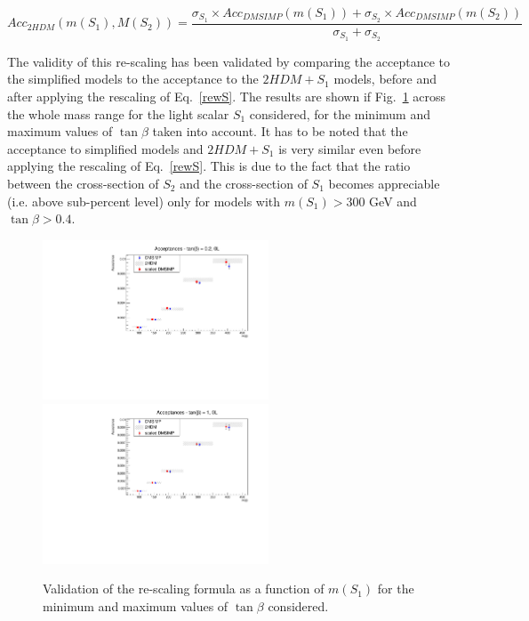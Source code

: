 \begin{equation}
Acc_{2HDM}(m(S_1),M(S_2))=\frac{\sigma_{S_1} \times Acc_{DMSIMP}(m(S_{1}))+
\sigma_{S_2} \times Acc_{DMSIMP}(m(S_{2}))}{\sigma_{S_1}+\sigma_{S_2}}
\label{rewS}
\end{equation}


The validity of this re-scaling has been validated by comparing the acceptance 
to the simplified models to the acceptance to the $2HDM+S_1$ models, before and 
after applying the rescaling of Eq.~\ref{rewS}. The results are shown if Fig.~\ref{fig:rescS1} across the whole
mass range for the light scalar $S_1$ considered, for the minimum and maximum values of 
$\tan\beta$ taken into account. 
It has to be noted that the acceptance to simplified models and $2HDM+S_1$ is very similar even 
before applying the rescaling of Eq.~\ref{rewS}.
This is due to the fact that the ratio between the cross-section of $S_2$ and the cross-section of $S_1$
becomes appreciable (i.e. above sub-percent level) only for models with $m(S_1)>300$ GeV
 and $\tan\beta > 0.4$.\\

\begin{figure}
  \centering
  \includegraphics[width=0.6\textwidth]{texinputs/04_grid/figures/DMHF/THDMs/rescalingS1tgb02.pdf}
   \includegraphics[width=0.6\textwidth]{texinputs/04_grid/figures/DMHF/THDMs/rescalingS1tgb10.pdf}
\caption{Validation of the re-scaling formula as a function of $m(S_1)$ for the minimum and maximum values of $\tan{\beta}$ considered.}
 \label{fig:rescS1}
\end{figure}

